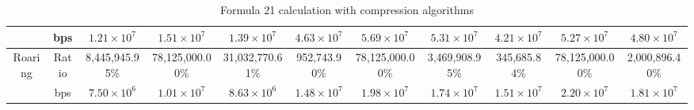 \begin{table}[h]
{\begin{tabular}{|c|c|c|c|c|c|c|c|c|c|c|}
\cline{2-11}
& bps & $1.21 \times 10^{7}$ & $1.51 \times 10^{7}$ & $1.39 \times 10^{7}$ & $4.63 \times 10^{7}$ & $5.69 \times 10^{7}$ & $5.31 \times 10^{7}$ & $4.21 \times 10^{7}$ & $5.27 \times 10^{7}$ & $4.80 \times 10^{7}$ \\
\hline
\multirow{2}{*}{Roaring} & Ratio & 8,445,945.95\% & 78,125,000.00\% & 31,032,770.61\% & 952,743.90\% & 78,125,000.00\% & 3,469,908.95\% & 345,685.84\% & 78,125,000.00\% & 2,000,896.40\% \\
\cline{2-11}
& bps & $7.50 \times 10^{6}$ & $1.01 \times 10^{7}$ & $8.63 \times 10^{6}$ & $1.48 \times 10^{7}$ & $1.98 \times 10^{7}$ & $1.74 \times 10^{7}$ & $1.51 \times 10^{7}$ & $2.20 \times 10^{7}$ & $1.81 \times 10^{7}$ \\
\hline
\end{tabular}
}
\caption{Formula 21 calculation with compression algorithms}
\label{tbl:formulacompress21}
\end{table}


